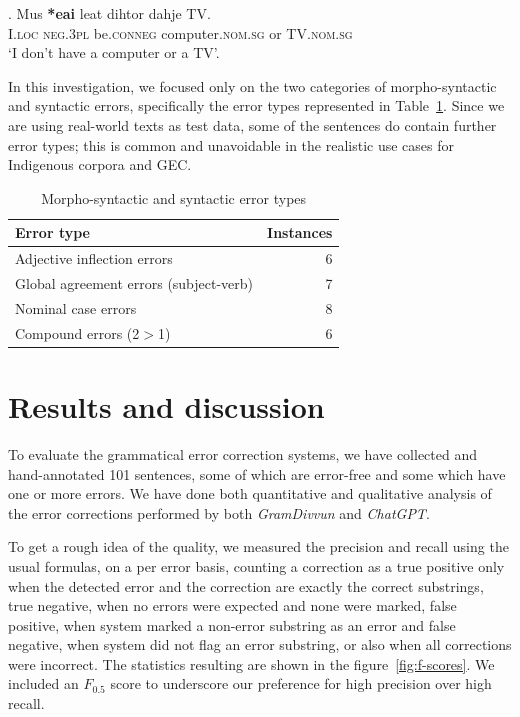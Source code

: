 \documentclass[free]{flammie}
\begin{document}
\exg. Mus \textbf{*eai} leat dihtor dahje TV.\label{TV}\\
I\textsc{.loc} \textsc{neg.3pl} be\textsc{.conneg} computer\textsc{.nom.sg} or
TV\textsc{.nom.sg}\\
`I don't have a computer or a TV'.


In this investigation, we focused only on the two categories of morpho-syntactic
and syntactic errors, specifically the error types represented in
Table~\ref{errortypes}. Since we are using real-world texts as test data, some
of the sentences do contain further error types; this is common and unavoidable
in the realistic use cases for Indigenous corpora and GEC.\


\begin{table}
    \small
    \centering
    \begin{tabular}{lr}
        \toprule
        Error type &  Instances \\
        \midrule
        Adjective inflection errors & 6 \\
        Global agreement errors (subject-verb) & 7 \\
        Nominal case errors & 8 \\
        Compound errors (2$>$1) & 6 \\
        \bottomrule
    \end{tabular}
    \caption{Morpho-syntactic and syntactic error types\label{errortypes}}
\end{table}



\section{Results and discussion}

To evaluate the grammatical error correction systems, we have collected and
hand-annotated 101 sentences, some of which are error-free and
some which have one or more errors. We have done both quantitative and
qualitative analysis of the error corrections performed by both
\textit{GramDivvun} and \textit{ChatGPT}.

To get a rough idea of the quality, we measured the precision and recall using
the usual formulas, on a per error basis, counting a correction as a true
positive only when the detected error and the correction are exactly the correct
substrings, true negative, when no errors were expected and none were marked,
false positive, when system marked a non-error substring as an error and false
negative, when system did not flag an error substring, or also when all
corrections were incorrect. The statistics resulting are shown in the
figure~\ref{fig:f-scores}. We included an $F_{0.5}$ score to underscore our
preference for high precision over high recall.
\end{document}
